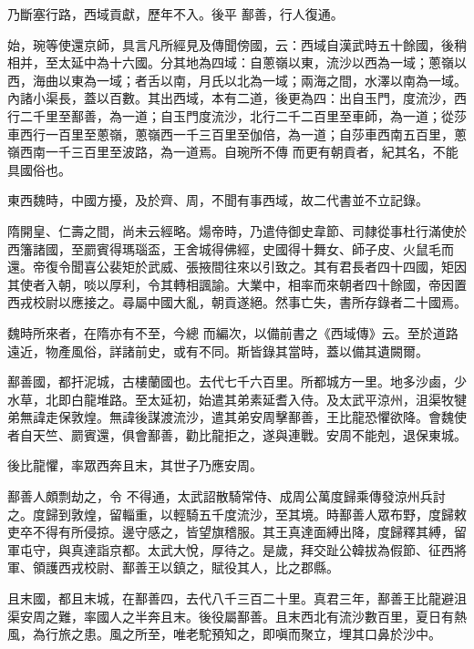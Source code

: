 \begin{pinyinscope}
 乃斷塞行路，西域貢獻，歷年不入。後平
 鄯善，行人復通。



 始，琬等使還京師，具言凡所經見及傳聞傍國，云：西域自漢武時五十餘國，後稍相并，至太延中為十六國。分其地為四域：自蔥嶺以東，流沙以西為一域；蔥嶺以西，海曲以東為一域；者舌以南，月氏以北為一域；兩海之間，水澤以南為一域。內諸小渠長，蓋以百數。其出西域，本有二道，後更為四：出自玉門，度流沙，西行二千里至鄯善，為一道；自玉門度流沙，北行二千二百里至車師，為一道；從莎車西行一百里至蔥嶺，蔥嶺西一千三百里至伽倍，為一道；自莎車西南五百里，蔥嶺西南一千三百里至波路，為一道焉。自琬所不傳
 而更有朝貢者，紀其名，不能具國俗也。



 東西魏時，中國方擾，及於齊、周，不聞有事西域，故二代書並不立記錄。



 隋開皇、仁壽之間，尚未云經略。煬帝時，乃遣侍御史韋節、司隸從事杜行滿使於西籓諸國，至罽賓得瑪瑙盃，王舍城得佛經，史國得十舞女、師子皮、火鼠毛而還。帝復令聞喜公裴矩於武威、張掖間往來以引致之。其有君長者四十四國，矩因其使者入朝，啖以厚利，令其轉相諷諭。大業中，相率而來朝者四十餘國，帝因置西戎校尉以應接之。尋屬中國大亂，朝貢遂絕。然事亡失，書所存錄者二十國焉。



 魏時所來者，在隋亦有不至，今總
 而編次，以備前書之《西域傳》云。至於道路遠近，物產風俗，詳諸前史，或有不同。斯皆錄其當時，蓋以備其遺闕爾。



 鄯善國，都扞泥城，古樓蘭國也。去代七千六百里。所都城方一里。地多沙鹵，少水草，北即白龍堆路。至太延初，始遣其弟素延耆入侍。及太武平涼州，沮渠牧犍弟無諱走保敦煌。無諱後謀渡流沙，遣其弟安周擊鄯善，王比龍恐懼欲降。會魏使者自天竺、罽賓還，俱會鄯善，勸比龍拒之，遂與連戰。安周不能剋，退保東城。



 後比龍懼，率眾西奔且末，其世子乃應安周。



 鄯善人頗剽劫之，令
 不得通，太武詔散騎常侍、成周公萬度歸乘傳發涼州兵討之。度歸到敦煌，留輜重，以輕騎五千度流沙，至其境。時鄯善人眾布野，度歸敕吏卒不得有所侵掠。邊守感之，皆望旗稽服。其王真達面縛出降，度歸釋其縛，留軍屯守，與真達詣京都。太武大悅，厚待之。是歲，拜交趾公韓拔為假節、征西將軍、領護西戎校尉、鄯善王以鎮之，賦役其人，比之郡縣。



 且末國，都且末城，在鄯善四，去代八千三百二十里。真君三年，鄯善王比龍避沮渠安周之難，率國人之半奔且末。後役屬鄯善。且末西北有流沙數百里，夏日有熱
 風，為行旅之患。風之所至，唯老駝預知之，即嗔而聚立，埋其口鼻於沙中。




\end{pinyinscope}
